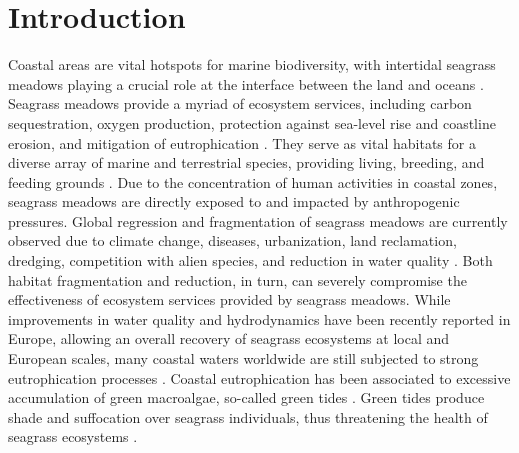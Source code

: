 \documentclass[
  number]{elsarticle}
\begin{document}
\section{Introduction}\label{introduction}

Coastal areas are vital hotspots for marine biodiversity, with
intertidal seagrass meadows playing a crucial role at the interface
between the land and oceans \citep{unsworth2022}. Seagrass meadows
provide a myriad of ecosystem services, including carbon sequestration,
oxygen production, protection against sea-level rise and coastline
erosion, and mitigation of eutrophication \citetext{\citealp[
]{unsworth2022}; \citealp{sousa2019blue}}. They serve as vital habitats
for a diverse array of marine and terrestrial species, providing living,
breeding, and feeding grounds \citetext{\citealp[
]{gardner2018}; \citealp[ ]{Zoffoli2022}; \citealp{jankowska2019}}. Due
to the concentration of human activities in coastal zones, seagrass
meadows are directly exposed to and impacted by anthropogenic pressures.
Global regression and fragmentation of seagrass meadows are currently
observed due to climate change, diseases, urbanization, land
reclamation, dredging, competition with alien species, and reduction in
water quality \citetext{\citealp[ ]{nguyen2021}; \citealp[
]{soissons2018}; \citealp[ ]{orth2006}; \citealp[ ]{lin2018}; \citealp[
]{duffy2019}; \citealp[ ]{rasheed2011long}; \citealp[
]{chefaoui2018dramatic}; \citealp{sousa2019blue}}. Both habitat
fragmentation and reduction, in turn, can severely compromise the
effectiveness of ecosystem services provided by seagrass meadows. While
improvements in water quality and hydrodynamics have been recently
reported in Europe, allowing an overall recovery of seagrass ecosystems
at local and European scales, many coastal waters worldwide are still
subjected to strong eutrophication processes \citetext{\citealp[
]{deSantos2019}; \citealp[ ]{Zoffoli2021}; \citealp{sousa2019blue}}.
Coastal eutrophication has been associated to excessive accumulation of
green macroalgae, so-called green tides \citep{devlin2023nutrients}.
Green tides produce shade and suffocation over seagrass individuals,
thus threatening the health of seagrass ecosystems \citep{wang2022}.
\end{document}
